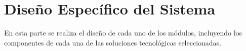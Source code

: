 \section{Diseño Específico del Sistema}

En esta parte se realiza el diseño de cada uno de los módulos, incluyendo los componentes de cada una de las soluciones tecnológicas seleccionadas.













